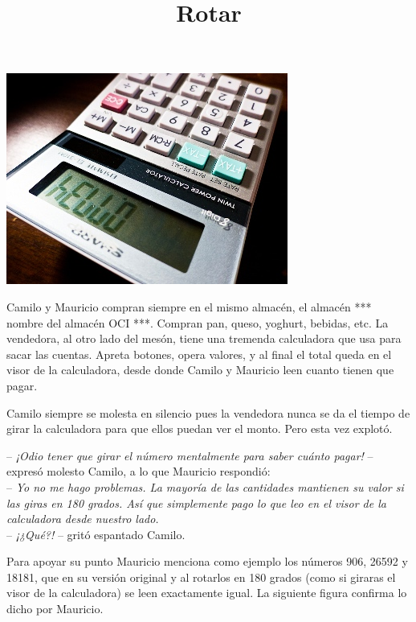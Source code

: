 \documentclass{oci}
\title{Rotar}
\begin{document}
\begin{problemDescription}

  \centerline{\includegraphics[scale=0.5]{upside-down.jpg}}


Camilo y Mauricio compran siempre en el mismo almacén, el almacén *** nombre del almacén OCI ***. Compran pan, queso, yoghurt, bebidas, etc. 
La vendedora, al otro lado del mesón, tiene una tremenda calculadora que usa para sacar las cuentas. 
Apreta botones, opera valores, y al final el total queda en el visor de la calculadora, 
desde donde Camilo y Mauricio leen cuanto tienen que pagar.

Camilo siempre se molesta en silencio pues la vendedora nunca se da el tiempo de girar la calculadora para que ellos puedan ver el monto.
Pero esta vez explotó.

-- \emph{¡Odio tener que girar el número mentalmente para saber cuánto pagar!} -- expresó molesto Camilo, a lo que Mauricio respondió: \\
-- \emph{Yo no me hago problemas. La mayoría de las cantidades mantienen su valor si las giras en 180 grados. Así que simplemente pago lo que leo en el visor de la calculadora desde nuestro lado.} \\
-- \emph{¡¿Qué?!} -- gritó espantado Camilo.

Para apoyar su punto Mauricio menciona como ejemplo los números 906, 26592 y 18181, que en su versión original y al rotarlos en 180 grados (como si giraras el visor de la calculadora) se leen exactamente igual. La siguiente figura confirma lo dicho por Mauricio.

\bigskip
\bigskip

\begin{center}
\resizebox{!}{40pt}{} \hspace*{50pt}  
\resizebox{!}{40pt}{} \hspace*{50pt}  
\resizebox{!}{40pt}{}\bigskip


\end{center}
\end{problemDescription}
\end{document}
